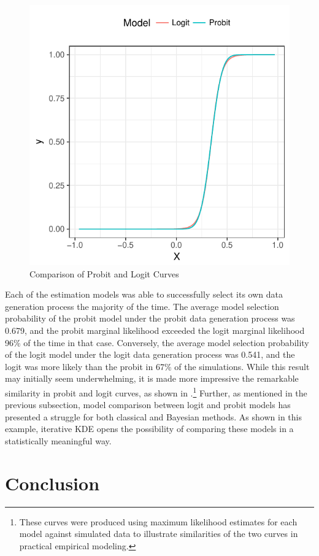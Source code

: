 \documentclass[twocolumn]{article}
\begin{document}
\begin{figure}
	\centering
	\includegraphics[width=\linewidth]{Probit-Logit-Fitted.pdf}
	\caption{Comparison of Probit and Logit Curves}
	\label{fig:Probit-Logit-Fit}
\end{figure}

Each of the estimation models was able to successfully select its own data generation process the majority of the time. The average model selection probability of the probit model under the probit data generation process was 0.679, and the probit marginal likelihood exceeded the logit marginal likelihood 96\% of the time in that case. Conversely, the average model selection probability of the logit model under the logit data generation process was 0.541, and the logit was more likely than the probit in 67\% of the simulations. While this result may initially seem underwhelming, it is made more impressive the remarkable similarity in probit and logit curves, as shown in .\footnote{These curves were produced using maximum likelihood estimates for each model against simulated data to illustrate similarities of the two curves in practical empirical modeling.}  Further, as mentioned in the previous subsection, model comparison between logit and probit models has presented a struggle for both classical and Bayesian methods. As shown in this example, iterative KDE opens the possibility of comparing these models in a statistically meaningful way.

\section{Conclusion}



\end{document}
